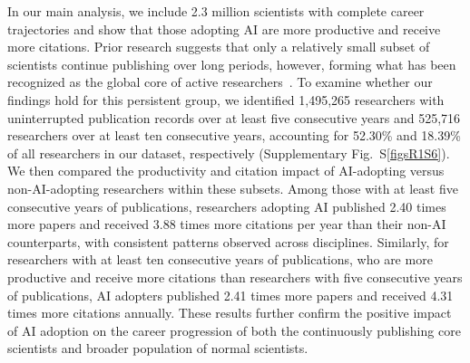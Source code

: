 In our main analysis, we include 2.3 million scientists with complete career trajectories and show that those adopting AI are more productive and receive more citations.
Prior research suggests that only a relatively small subset of scientists continue publishing over long periods, however, forming what has been recognized as the global core of active researchers~\supercite{ioannidis2014estimates}.
To examine whether our findings hold for this persistent group, we identified 1,495,265 researchers with uninterrupted publication records over at least five consecutive years and 525,716 researchers over at least ten consecutive years, accounting for 52.30\% and 18.39\% of all researchers in our dataset, respectively (Supplementary Fig.~S\ref{figsR1S6}).
We then compared the productivity and citation impact of AI-adopting versus non-AI-adopting researchers within these subsets.
Among those with at least five consecutive years of publications, researchers adopting AI published 2.40 times more papers and received 3.88 times more citations per year than their non-AI counterparts, with consistent patterns observed across disciplines.
Similarly, for researchers with at least ten consecutive years of publications, who are more productive and receive more citations than researchers with five consecutive years of publications, AI adopters published 2.41 times more papers and received 4.31 times more citations annually.
These results further confirm the positive impact of AI adoption on the career progression of both the continuously publishing core scientists and broader population of normal scientists.

